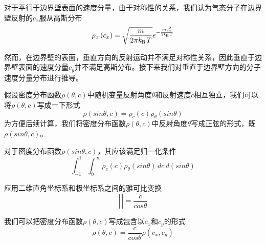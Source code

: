     对于平行于边界壁表面的速度分量，由于对称性的关系，我们认为气态分子在边界壁反射的$c_x$服从高斯分布\chinesecolon
    \[
        \rho_x\left(c_x\right)=\sqrt{\frac{m}{2\pi\it k_{\rm B} \it T}}e^{-\frac{mc_x^2}{2\it k_{\rm B} \it T}}
    \]

    然而，在边界壁的表面，垂直方向的反射运动并不满足对称性关系，因此垂直于边界壁表面的速度分量$c_y$并不满足高斯分布。接下来我们对垂直于边界壁方向的分子速度分量分布进行推导。

    假设密度分布函数$\rho\left(\theta, c\right)$中随机变量反射角度$\theta$和反射速度$c$相互独立，我们可以将$\rho\left(\theta, c\right)$写成一下形式\chinesecolon
    \[
        \rho\left(sin\theta,c\right)=\rho_c\left(c\right)\rho_\theta\left(sin\theta\right)
    \]
    为方便后续计算，我们将密度分布函数$\rho\left(\theta, c\right)$中反射角度$\theta$写成正弦的形式，既$\rho(sin\theta,c)$。
    
    对于密度分布函数$\rho\left(sin\theta,c\right)$，其应该满足归一化条件\chinesecolon
    \[
        \int_{-1}^{1} \int_{0}^{\infty}  \rho_c\left(c\right) \rho_\theta\left(sin\theta\right)\,dc  \,d\left(sin\theta\right) 
    \]

    应用二维直角坐标系和极坐标系之间的雅可比变换
    \[
        |\frac{}{}|=\frac{c}{cos\theta}
    \]

    我们可以把密度分布函数$\rho\left(\theta, c\right)$写成包含以$c_x$和$c_y$的形式
    \[
        \rho\left(\theta, c\right)=\frac{c}{cos\theta}\rho\left(c_x,c_y\right)
    \]